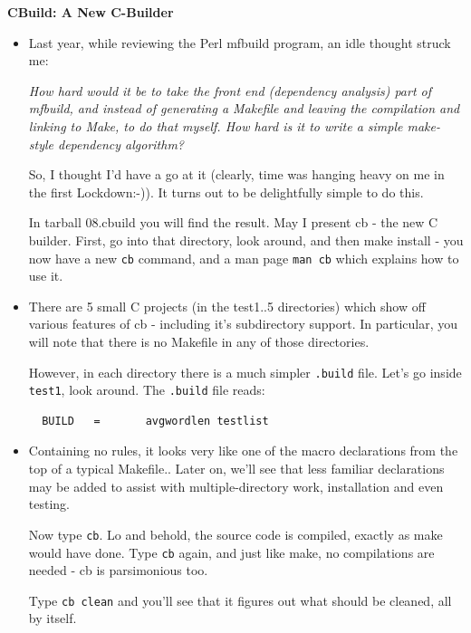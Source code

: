 \documentclass[aspectratio=169]{beamer}
\newcommand\myheading[1]{%
  \par\bigskip
  {\Large\bfseries#1}\par\smallskip}
\begin{document}
\begin{frame}[fragile]

  \myheading{CBuild: A New C-Builder}

    \begin{itemize}
      \item
      Last year, while reviewing the Perl mfbuild program, an idle thought struck me:

    \pitem
      {\em How hard would it be to take the front end (dependency analysis)
      part of mfbuild, and instead of generating a Makefile and leaving
      the compilation and linking to Make, to do that myself.  How hard is
      it to write a simple make-style dependency algorithm?}

     \pitem
       So, I thought I'd have a go at it (clearly, time was hanging heavy on me
       in the first Lockdown:-)).  It turns out to be delightfully simple to
       do this.

      \pitem
      In \alert{tarball 08.cbuild} you will find the result.  May I present
      \alert{cb} - the new C builder.  
      First, go into that directory, look around,
      and then \alert{make install} - you now have a new \verb+cb+ command,
      and a man page \verb+man cb+ which explains how to use it.

    \end{itemize}

\end{frame}


\begin{frame}[fragile]
  \begin{itemize}

  \item
  There are 5 small C projects (in the test1..5 directories) which show off
  various features of \alert{cb} - including it's subdirectory support.  In
  particular, you will note that there is \alert{no Makefile} in any of
  those directories.

  \pitem
  However, in each directory there is a much simpler \verb+.build+ file.
  Let's go inside \verb+test1+, look around. The \verb+.build+ file reads:

\tiny
\begin{verbatim}
  BUILD   =       avgwordlen testlist
\end{verbatim}
\small

  \item
  Containing no rules, it looks very like one of the macro declarations
  from the top of a typical Makefile..
  \pause
  Later on, we'll see that less familiar declarations may be added to
  assist with multiple-directory work, installation and even testing.

  \pitem
  Now type \verb+cb+.  Lo and behold, the source code is compiled,
  exactly as make would have done.  
  Type \verb+cb+ again, and just like make, no compilations are needed -
  \alert{cb} is parsimonious too.

  \pitem
  Type \verb+cb clean+ and you'll see that it figures out what should be
  cleaned, all by itself.

  \end{itemize}
\end{frame}
\end{document}
